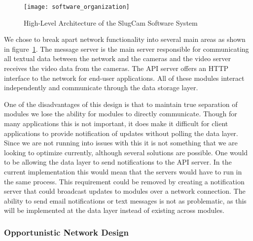 \begin{figure}[!t]
\centering
\texttt{[image: software\_organization]}
\caption{High-Level Architecture of the SlugCam Software System}
\label{fig_netoverview}
\end{figure}

We chose to break apart network functionality into several main areas as shown
in figure~\ref{fig_netoverview}. The message server is the main server
responsible for communicating all textual data between the network and the
cameras and the video server receives the video data from the cameras. The API
server offers an HTTP interface to the network for end-user applications. All of
these modules interact independently and communicate through the data storage
layer. 

One of the disadvantages of this design is that to maintain true separation of
modules we lose the ability for modules to directly communicate.  Though for
many applications this is not important, it does make it difficult for client
applications to provide notification of updates without polling the data layer.
Since we are not running into issues with this it is not something that we are
looking to optimize currently, although several solutions are possible. One
would to be allowing the data layer to send notifications to the API server.  In
the current implementation this would mean that the servers would have to run in
the same process. This requirement could be removed by creating a notification
server that could broadcast updates to modules over a network connection. The
ability to send email notifications or text messages is not as problematic, as
this will be implemented at the data layer instead of existing across modules.




\subsubsection{Opportunistic Network Design}


